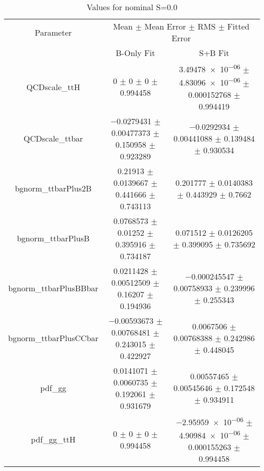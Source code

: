 \begin{table}
\centering
\caption{Values for nominal S=0.0}
\begin{tabular}{ccc}
\toprule
Parameter & \multicolumn{2}{c}{Mean $\pm$ Mean Error $\pm$ RMS $\pm$ Fitted Error}\\
 & B-Only Fit & S+B Fit\\
\midrule
QCDscale\_ttH & \num{0} $\pm$ \num{0} $\pm$ \num{0} $\pm$ \num{0.994458} & \num{3.49478e-06} $\pm$ \num{4.83096e-06} $\pm$ \num{0.000152768} $\pm$ \num{0.994419}\\
QCDscale\_ttbar & \num{-0.0279431} $\pm$ \num{0.00477373} $\pm$ \num{0.150958} $\pm$ \num{0.923289} & \num{-0.0292934} $\pm$ \num{0.00441088} $\pm$ \num{0.139484} $\pm$ \num{0.930534}\\
bgnorm\_ttbarPlus2B & \num{0.21913} $\pm$ \num{0.0139667} $\pm$ \num{0.441666} $\pm$ \num{0.743113} & \num{0.201777} $\pm$ \num{0.0140383} $\pm$ \num{0.443929} $\pm$ \num{0.7662}\\
bgnorm\_ttbarPlusB & \num{0.0768573} $\pm$ \num{0.01252} $\pm$ \num{0.395916} $\pm$ \num{0.734187} & \num{0.071512} $\pm$ \num{0.0126205} $\pm$ \num{0.399095} $\pm$ \num{0.735692}\\
bgnorm\_ttbarPlusBBbar & \num{0.0211428} $\pm$ \num{0.00512509} $\pm$ \num{0.16207} $\pm$ \num{0.194936} & \num{-0.000245547} $\pm$ \num{0.00758933} $\pm$ \num{0.239996} $\pm$ \num{0.255343}\\
bgnorm\_ttbarPlusCCbar & \num{-0.00593673} $\pm$ \num{0.00768481} $\pm$ \num{0.243015} $\pm$ \num{0.422927} & \num{0.0067506} $\pm$ \num{0.00768388} $\pm$ \num{0.242986} $\pm$ \num{0.448045}\\
pdf\_gg & \num{0.0141071} $\pm$ \num{0.0060735} $\pm$ \num{0.192061} $\pm$ \num{0.931679} & \num{0.00557465} $\pm$ \num{0.00545646} $\pm$ \num{0.172548} $\pm$ \num{0.934911}\\
pdf\_gg\_ttH & \num{0} $\pm$ \num{0} $\pm$ \num{0} $\pm$ \num{0.994458} & \num{-2.95959e-06} $\pm$ \num{4.90984e-06} $\pm$ \num{0.000155263} $\pm$ \num{0.994458}\\
\bottomrule
\end{tabular}
\end{table}